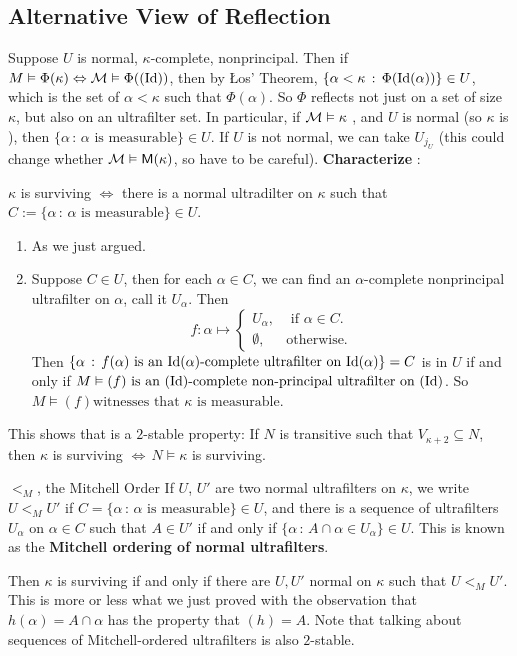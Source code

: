 \documentclass{article}
\begin{document}
\subsection{Alternative View of Reflection}
Suppose $U$ is normal, $\kappa$-complete, nonprincipal. Then if $M \vDash \Phi(\kappa) \Leftrightarrow \mathcal{M} \vDash \Phi((\operatorname{Id}))$, then by \L os' Theorem, $\{\alpha <\kappa \, : \, \Phi(\operatorname{Id}(\alpha))\} \in U$, which is the set of $\alpha < \kappa$ such that $\Phi(\alpha)$. So $\Phi$ reflects not just on a set of size $\kappa$, but also on an ultrafilter set. In particular, if $\mathcal{M} \vDash \kappa$ , and $U$ is normal (so $\kappa$ is ), then $\{ \alpha \, : \, \alpha \text{ is measurable}\} \in U$. 
If $U$ is not normal, we can take $U_{j_{U}}$ (this could change whether $\mathcal{M} \vDash \mathsf{M}(\kappa)$, so have to be careful). 
\gap 
\textbf{Characterize }:\gap 
\begin{fancythm}{}
    $\kappa$ is surviving $\Leftrightarrow$ there is a normal ultradilter on $\kappa$ such that $C := \{ \alpha \, : \, \alpha \text{ is measurable} \} \in U$.
\end{fancythm}
\proof \hspace{0.1cm}
\begin{enumerate}
    \item[$\Rightarrow$] As we just argued.
    \item[$\Leftarrow$] Suppose $C \in U$, then for each $\alpha \in C$, we can find an $\alpha$-complete nonprincipal ultrafilter on $\alpha$, call it $U_{\alpha}$. Then \[ f : \alpha \mapsto \begin{cases}
        U_{\alpha}, & \text{ if $\alpha \in C$.}\\
        \emptyset, & \text{otherwise.}
    \end{cases} \]
    Then $\{\alpha \, : \, f(\alpha) \text{ is an $\operatorname{Id}(\alpha)$-complete ultrafilter on $\operatorname{Id}(\alpha)$}\} = C$ is in $U$ if and only if $M \vDash (f) \text{ is an $(\operatorname{Id})$-complete non-principal ultrafilter on $(\operatorname{Id})$}$. So $M \models (f) \text{witnesses that $\kappa$ is measurable}$. 
\end{enumerate}
\endproof
This shows that  is a $2$-stable property: If $N$ is transitive such that $V_{\kappa + 2} \subseteq N$, then $\kappa$ is surviving $\Leftrightarrow \, N \models \kappa$ is surviving.
\begin{fancydefine}{$<_{M}$, the Mitchell Order}
    If $U$, $U'$ are two normal ultrafilters on $\kappa$, we write $U <_{M} U'$ if $C = \{ \alpha \, : \, \alpha \text{ is measurable}\} \in U$, and there is a sequence of ultrafilters $U_{\alpha}$ on $\alpha \in C$ such that $A \in U'$ if and only if $\{\alpha \, : \, A \cap \alpha \in U_{\alpha}\} \in U$.\gap 
    This is known as the \textbf{Mitchell ordering of normal ultrafilters}.
\end{fancydefine}
Then $\kappa$ is surviving if and only if there are $U,U'$ normal on $\kappa$ such that $U<_{M}U'$. This is more or less what we just proved with the observation that $h(\alpha) = A \cap \alpha$ has the property that $(h)=A$. \gap 
Note that talking about sequences of Mitchell-ordered ultrafilters is also $2$-stable.
\end{document}
